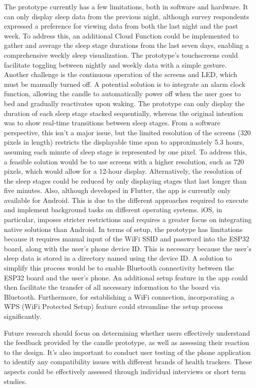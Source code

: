 \documentclass[
  a4paper,  %
  twoside,  %
  bibliography=totoc,
  headsepline,
  cleardoublepage=empty,
  parskip=half,
  draft=false
]{scrbook}
\begin{document}
The prototype currently has a few limitations, both in software and hardware. It can only display sleep data from the previous night, although survey respondents expressed a preference for viewing data from both the last night and the past week. To address this, an additional Cloud Function could be implemented to gather and average the sleep stage durations from the last seven days, enabling a comprehensive weekly sleep visualization. The prototype's touchscreens could facilitate toggling between nightly and weekly data with a simple gesture. Another challenge is the continuous operation of the screens and LED, which must be manually turned off. A potential solution is to integrate an alarm clock function, allowing the candle to automatically power off when the user goes to bed and gradually reactivates upon waking. The prototype can only display the duration of each sleep stage stacked sequentially, whereas the original intention was to show real-time transitions between sleep stages. From a software perspective, this isn't a major issue, but the limited resolution of the screens (320 pixels in length) restricts the displayable time span to approximately 5.3 hours, assuming each minute of sleep stage is represented by one pixel. To address this, a feasible solution would be to use screens with a higher resolution, such as 720 pixels, which would allow for a 12-hour display. Alternatively, the resolution of the sleep stages could be reduced by only displaying stages that last longer than five minutes. Also, although developed in Flutter, the app is currently only available for Android. This is due to the different approaches required to execute and implement background tasks on different operating systems. iOS, in particular, imposes stricter restrictions and requires a greater focus on integrating native solutions than Android. In terms of setup, the prototype has limitations because it requires manual input of the WiFi SSID and password into the ESP32 board, along with the user's phone device ID. This is necessary because the user's sleep data is stored in a directory named using the device ID. A solution to simplify this process would be to enable Bluetooth connectivity between the ESP32 board and the user's phone. An additional setup feature in the app could then facilitate the transfer of all necessary information to the board via Bluetooth. Furthermore, for establishing a WiFi connection, incorporating a WPS (WiFi Protected Setup) feature could streamline the setup process significantly.

Future research should focus on determining whether users effectively understand the feedback provided by the candle prototype, as well as assessing their reaction to the design. It's also important to conduct user testing of the phone application to identify any compatibility issues with different brands of health trackers. These aspects could be effectively assessed through individual interviews or short term studies.
\end{document}
